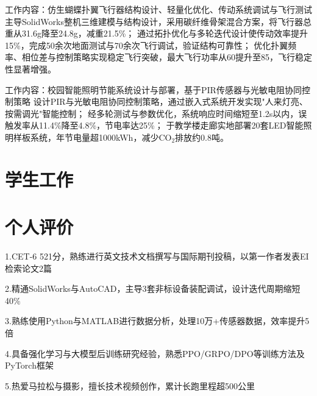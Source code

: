 \documentclass{resume}
\begin{document}
{工作内容：仿生蝴蝶扑翼飞行器结构设计、轻量化优化、传动系统调试与飞行测试}
\Content
{ 主导SolidWorks整机三维建模与结构设计，采用碳纤维骨架混合方案，将飞行器总重从31.6g降至24.8g，减重21.5\%；}
{ 通过拓扑优化与多轮迭代设计使传动效率提升15\%，完成50余次地面测试与70余次飞行调试，验证结构可靠性；}
{ 优化扑翼频率、相位差与控制策略实现稳定飞行突破，最大飞行功率从60提升至85，飞行稳定性显著增强。}

{工作内容：校园智能照明节能系统设计与部署，基于PIR传感器与光敏电阻协同控制策略}
\Content
{ 设计PIR与光敏电阻协同控制策略，通过嵌入式系统开发实现"人来灯亮、按需调光"智能控制；}
{ 经多轮测试与参数优化，系统响应时间缩短至1.2s以内，误触发率从11.4\%降至4.8\%，节电率达25\%；}
{ 于教学楼走廊实地部署20套LED智能照明样板系统，年节电量超1000kWh，减少CO$_2$排放约0.8吨。}



\section{学生工作}




\section{个人评价}

{1.CET-6 521分，熟练进行英文技术文档撰写与国际期刊投稿，以第一作者发表EI检索论文2篇}

{2.精通SolidWorks与AutoCAD，主导3套非标设备装配调试，设计迭代周期缩短40\%}

{3.熟练使用Python与MATLAB进行数据分析，处理10万+传感器数据，效率提升5倍}

{4.具备强化学习与大模型后训练研究经验，熟悉PPO/GRPO/DPO等训练方法及PyTorch框架}

{5.热爱马拉松与摄影，擅长技术视频创作，累计长跑里程超500公里}
\end{document}
